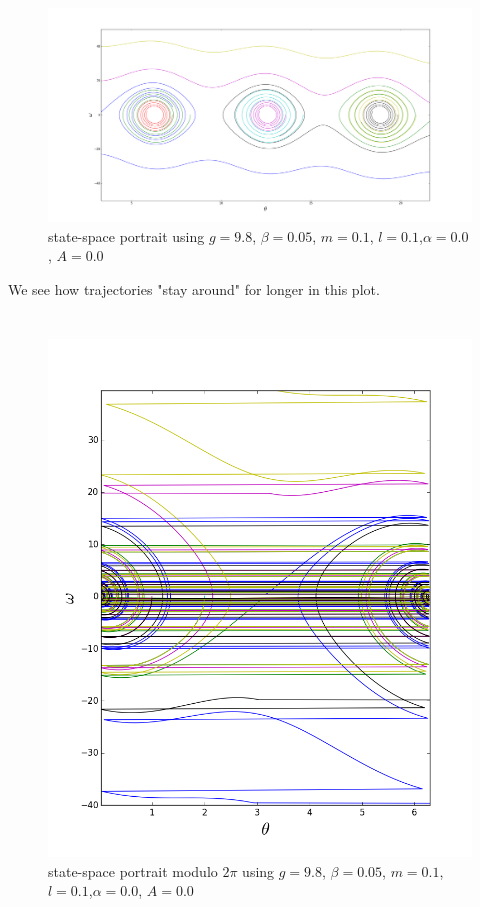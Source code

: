 \documentclass[12pt]{article}\pagestyle{myheadings}
\theoremstyle{plain}
\begin{document}
\begin{figure}[H]
\centering
\includegraphics[scale=.15]{4extra}
\caption{state-space portrait using $g = 9.8$, $\beta = 0.05$, $m = 0.1$, $l = 0.1$,$\alpha = 0.0$, $A = 0.0$}
\label{fig:my_label}
\end{figure}

We see how trajectories "stay around" for longer in this plot. 

\section{}

\begin{figure}[H]
\centering
\includegraphics[scale=.3]{5}
\caption{state-space portrait modulo $2\pi$ using $g = 9.8$, $\beta = 0.05$, $m = 0.1$, $l = 0.1$,$\alpha = 0.0$, $A = 0.0$}
\label{fig:my_label}
\end{figure}
\end{document}

